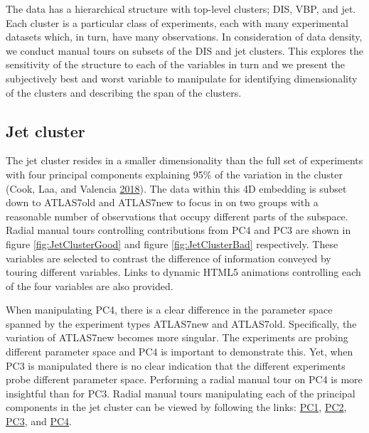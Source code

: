 The data has a hierarchical structure with top-level clusters; DIS, VBP,
and jet. Each cluster is a particular class of experiments, each with
many experimental datasets which, in turn, have many observations. In
consideration of data density, we conduct manual tours on subsets of the
DIS and jet clusters. This explores the sensitivity of the structure to
each of the variables in turn and we present the subjectively best and
worst variable to manipulate for identifying dimensionality of the
clusters and describing the span of the clusters.

\hypertarget{jet-cluster}{%
\subsection{Jet cluster}\label{jet-cluster}}

The jet cluster resides in a smaller dimensionality than the full set of
experiments with four principal components explaining 95\% of the
variation in the cluster (Cook, Laa, and Valencia
\protect\hyperlink{ref-cook_dynamical_2018}{2018}). The data within this
4D embedding is subset down to ATLAS7old and ATLAS7new to focus in on
two groups with a reasonable number of observations that occupy
different parts of the subspace. Radial manual tours controlling
contributions from PC4 and PC3 are shown in figure
\ref{fig:JetClusterGood} and figure \ref{fig:JetClusterBad}
respectively. These variables are selected to contrast the difference of
information conveyed by touring different variables. Links to dynamic
HTML5 animations controlling each of the four variables are also
provided.

When manipulating PC4, there is a clear difference in the parameter
space spanned by the experiment types ATLAS7new and ATLAS7old.
Specifically, the variation of ATLAS7new becomes more singular. The
experiments are probing different parameter space and PC4 is important
to demonstrate this. Yet, when PC3 is manipulated there is no clear
indication that the different experiments probe different parameter
space. Performing a radial manual tour on PC4 is more insightful than
for PC3. Radial manual tours manipulating each of the principal
components in the jet cluster can be viewed by following the links:
\href{https://nspyrison.netlify.com/thesis/jetcluster_manualtour_pc1/}{PC1},
\href{https://nspyrison.netlify.com/thesis/jetcluster_manualtour_pc2/}{PC2},
\href{https://nspyrison.netlify.com/thesis/jetcluster_manualtour_pc3/}{PC3},
and
\href{https://nspyrison.netlify.com/thesis/jetcluster_manualtour_pc4/}{PC4}.

